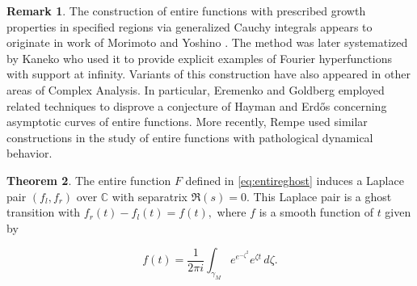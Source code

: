 \documentclass[12pt]{article}
\theoremstyle{definition}
\newtheorem{theorem}{Theorem}[section]
\newtheorem{remark}[theorem]{Remark}
\begin{document}
\begin{remark}
  The construction of entire functions with prescribed growth properties in specified regions via generalized Cauchy integrals appears to originate in work of Morimoto and Yoshino \cite{Morimoto}. The method was later systematized by Kaneko \cite{Kaneko} who used it to provide explicit examples of Fourier hyperfunctions with support at infinity. Variants of this construction have also appeared in other areas of Complex Analysis. In particular, Eremenko and Goldberg \cite{Eremenko} employed related techniques to disprove a conjecture of Hayman and Erdős concerning asymptotic curves of entire functions. More recently, Rempe \cite{Rempe} used similar constructions in the study of entire functions with pathological dynamical behavior.
\end{remark}



\begin{theorem}\label{thm:ghost}
The entire function $F$ defined in \eqref{eq:entireghost} 
induces a Laplace pair $(f_l,f_r)$ over $\mathbb{C}$ with separatrix  $\Re(s)=0.$ This Laplace pair is a ghost transition with $f_r(t)-f_l(t)=f(t),$ where $f$ is a smooth function of $t$ given by 

\[f(t)=\frac{1}{2\pi i}\int_{\gamma_M}e^{e^{- \zeta^2}}e^{\zeta t} \,d\zeta.\]


   
\end{theorem}
\end{document}
